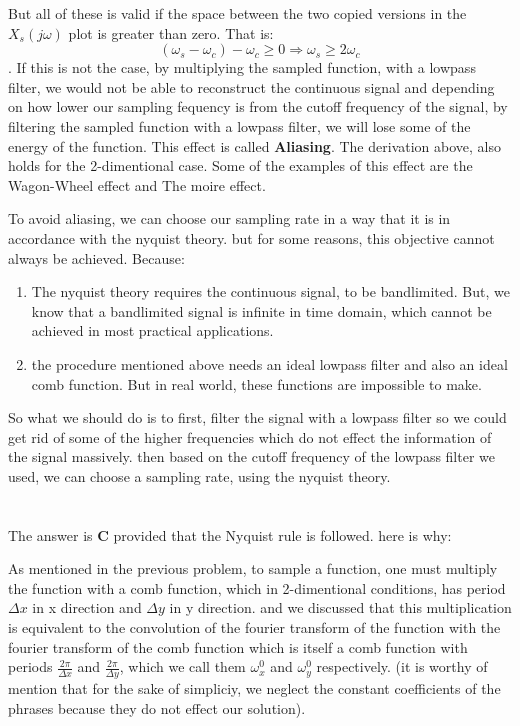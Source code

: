 \documentclass[12pt]{article}
\begin{document}
But all of these is valid if the space between the two copied versions in the $X_{s}(j\omega)$ plot is greater than zero. That is:
$$ (\omega_s - \omega_c) - \omega_c \geq 0 \Rightarrow \omega_s \geq 2 \omega_c$$.
If this is not the case, by multiplying the sampled function, with a lowpass filter, we would not be able to reconstruct the continuous signal and depending on how lower our sampling fequency is from the cutoff frequency of the signal, by filtering the sampled function with a lowpass filter, we will lose some of the energy of the function. This effect is called \textbf{Aliasing}. The derivation above, also holds for the 2-dimentional case. Some of the examples of this effect are the Wagon-Wheel effect and The moire effect.

To avoid aliasing, we can choose our sampling rate in a way that it is in accordance with the nyquist theory. but for some reasons, this objective cannot always be achieved. Because:
\begin{enumerate}
\item The nyquist theory requires the continuous signal, to be bandlimited. But, we know that a bandlimited signal is infinite in time domain, which cannot be achieved in most practical applications.
\item the procedure mentioned above needs an ideal lowpass filter and also an ideal comb function. But in real world, these functions are impossible to make.
\end{enumerate}

So what we should do is to first, filter the signal with a lowpass filter so we could get rid of some of the higher frequencies which do not effect the information of the signal massively. then based on the cutoff frequency of the lowpass filter we used, we can choose a sampling rate, using the nyquist theory. 

\section{}
The answer is \textbf{C} provided that the Nyquist rule is followed. here is why:

As mentioned in the previous problem, to sample a function, one must multiply the function with a comb function, which in 2-dimentional conditions, has period $\Delta x$ in x direction and $\Delta y$ in y direction. and we discussed that this multiplication is equivalent to the convolution of the fourier transform of the function with the fourier transform of the comb function which is itself a comb function with periods $\frac{2 \pi}{\Delta x}$ and $\frac{2 \pi}{\Delta y}$, which we call them $\omega^{0}_x$ and $\omega^{0}_y$ respectively. (it is worthy of mention that for the sake of simpliciy, we neglect the constant coefficients of the phrases because they do not effect our solution). 
\end{document}
